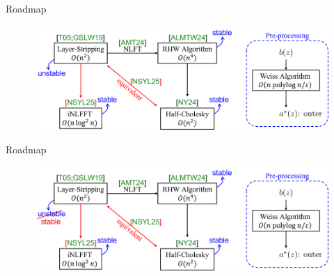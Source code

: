 \addtocounter{framenumber}{-1}
\begin{frame}{Roadmap}
    \begin{figure}
        \centering
        \includegraphics[width=1\linewidth]{figures/roadmap4.png}
    \end{figure}
\end{frame}
\addtocounter{framenumber}{-1}
\begin{frame}{Roadmap}
    \begin{figure}
        \centering
        \includegraphics[width=1\linewidth]{figures/roadmap.png}
    \end{figure}
\end{frame}


